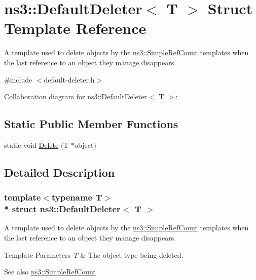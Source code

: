 \hypertarget{structns3_1_1DefaultDeleter}{}\section{ns3\+:\+:Default\+Deleter$<$ T $>$ Struct Template Reference}
\label{structns3_1_1DefaultDeleter}


A template used to delete objects by the \hyperlink{classns3_1_1SimpleRefCount}{ns3\+::\+Simple\+Ref\+Count} templates when the last reference to an object they manage disappears.  




{\ttfamily \#include $<$default-\/deleter.\+h$>$}



Collaboration diagram for ns3\+:\+:Default\+Deleter$<$ T $>$\+:
\subsection*{Static Public Member Functions}
\begin{DoxyCompactItemize}
\item 
static void \hyperlink{structns3_1_1DefaultDeleter_a06425101ff1f00af0efa0dbca24c280c}{Delete} (T $\ast$object)
\end{DoxyCompactItemize}


\subsection{Detailed Description}
\subsubsection*{template$<$typename T$>$\\*
struct ns3\+::\+Default\+Deleter$<$ T $>$}

A template used to delete objects by the \hyperlink{classns3_1_1SimpleRefCount}{ns3\+::\+Simple\+Ref\+Count} templates when the last reference to an object they manage disappears. 


\begin{DoxyTemplParams}{Template Parameters}
{\em T} & The object type being deleted. \\
\hline
\end{DoxyTemplParams}
\begin{DoxySeeAlso}{See also}
\hyperlink{classns3_1_1SimpleRefCount}{ns3\+::\+Simple\+Ref\+Count} 
\end{DoxySeeAlso}


